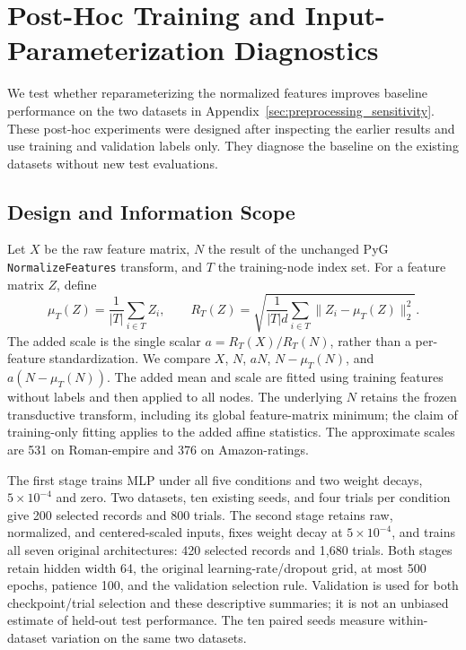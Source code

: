 \section{Post-Hoc Training and Input-Parameterization Diagnostics}
\label{app:training_diagnostics}

We test whether reparameterizing the normalized features improves baseline performance on the two datasets in Appendix~\ref{sec:preprocessing_sensitivity}. These post-hoc experiments were designed after inspecting the earlier results and use training and validation labels only. They diagnose the baseline on the existing datasets without new test evaluations.

\subsection{Design and Information Scope}

Let $X$ be the raw feature matrix, $N$ the result of the unchanged PyG \texttt{NormalizeFeatures} transform, and $T$ the training-node index set. For a feature matrix $Z$, define
\[
  \mu_T(Z)=\frac{1}{|T|}\sum_{i\in T}Z_i,
  \qquad
  R_T(Z)=\sqrt{\frac{1}{|T|d}\sum_{i\in T}\|Z_i-\mu_T(Z)\|_2^2}.
\]
The added scale is the single scalar $a=R_T(X)/R_T(N)$, rather than a per-feature standardization. We compare $X$, $N$, $aN$, $N-\mu_T(N)$, and $a(N-\mu_T(N))$. The added mean and scale are fitted using training features without labels and then applied to all nodes. The underlying $N$ retains the frozen transductive transform, including its global feature-matrix minimum; the claim of training-only fitting applies to the added affine statistics. The approximate scales are 531 on Roman-empire and 376 on Amazon-ratings.

The first stage trains MLP under all five conditions and two weight decays, $5\times10^{-4}$ and zero. Two datasets, ten existing seeds, and four trials per condition give 200 selected records and 800 trials. The second stage retains raw, normalized, and centered-scaled inputs, fixes weight decay at $5\times10^{-4}$, and trains all seven original architectures: 420 selected records and 1,680 trials. Both stages retain hidden width 64, the original learning-rate/dropout grid, at most 500 epochs, patience 100, and the validation selection rule. Validation is used for both checkpoint/trial selection and these descriptive summaries; it is not an unbiased estimate of held-out test performance. The ten paired seeds measure within-dataset variation on the same two datasets.

